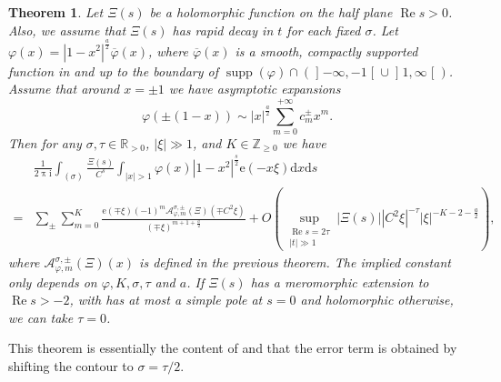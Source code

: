 \documentclass[10pt,oneside,reqno]{amsart}
\makeatletter
\newcommand\lopen{\mathopen{]}}
\newcommand\ropen{\mathclose{[}}
\newcommand\rmd{\mathrm{d}}
\newcommand\rme{\mathrm{e}}
\newcommand\rmi{\mathrm{i}}
\newcommand\cA{\mathcal{A}}
\newcommand\RR{\mathbb{R}}
\newcommand\ZZ{\mathbb{Z}}
\newcommand\dpii{2\uppi\rmi}
\renewcommand\Re{\mathop{\mathrm{Re}}}
\DeclareMathOperator\supp{supp}
\renewcommand\geq{\geqslant}
\theoremstyle{THEOREM}
\newtheorem{theorem}{Theorem}[section]
\theoremstyle{DEFINITION}
\theoremstyle{EXERCISE}
\numberwithin{equation}{section}
\renewenvironment{proof}[1][\proofname]{\par
  \vspace{-6pt}
  \pushQED{\qed}
  \normalfont \topsep6\p@\@plus6\p@\relax
  \trivlist
  \item[\hskip\labelsep\rmfamily\bfseries
    #1\@addpunct{:}]\ignorespaces
}{
  \popQED\endtrivlist\@endpefalse
  \vspace{-6pt}
}
\makeatother
\begin{document}
\begin{theorem}\label{thm:mainarchimedeantheorem2}
Let $\Xi(s)$ be a holomorphic function on the half plane $\Re s>0$. Also, we assume that $\Xi(s)$ has rapid decay in $t$ for each fixed $\sigma$. Let $\varphi(x)=|1-x^2|^{\frac a2}\overline{\varphi}(x)$, where $\overline{\varphi}(x)$ is a smooth, compactly supported function in and up to the boundary of $\supp(\varphi)\cap (\lopen -\infty,-1\ropen\cup\lopen 1,\infty\ropen)$. Assume that around $x=\pm 1$ we have asymptotic expansions
\[
\varphi(\pm(1-x))\sim |x|^{\frac{a}{2}}\sum_{m=0}^{+\infty}c_m^\pm x^m.
\]
Then for any $\sigma,\tau\in \RR_{>0}$, $|\xi|\gg 1$, and $K\in \ZZ_{\geq 0}$ we have
\begin{align*}
    & \frac{1}{\dpii}\int_{(\sigma)}\frac{\Xi(s)}{C^s}\int_{|x|>1}\varphi(x)|1-x^2|^{\frac s2} \rme(-x\xi)\rmd x\rmd s \\
   =  & \sum_{\pm}\sum_{m=0}^{K}\frac{\rme(\mp \xi)(-1)^m\cA_{\varphi,m}^{\sigma,\pm}(\Xi)(\mp C^2\xi)}{(\mp\xi)^{m+1+\frac a2}}+ O\left(\sup_{\substack{\Re s=2\tau \\ |t|\gg 1}}|\Xi(s)||C^2\xi|^{-\tau}|\xi|^{-K-2-\frac{a}{2}}\right),
\end{align*}
where $\cA_{\varphi,m}^{\sigma,\pm}(\Xi)(x)$ is defined in the previous theorem.
The implied constant only depends on $\varphi,K,\sigma,\tau$ and $a$. If $\Xi(s)$ has a meromorphic extension to $\Re s>-2$, with has at most a simple pole at $s=0$ and holomorphic otherwise, we can take $\tau=0$.
\end{theorem} 
\begin{proof}
This theorem is essentially the content of \cite[Theorem A.15]{altug2017} and that the error term is obtained by shifting the contour to $\sigma=\tau/2$. 
\end{proof}
\end{document}
